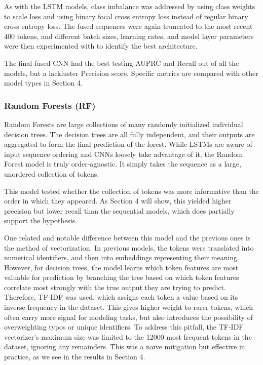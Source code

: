 \documentclass[11pt]{article}
\begin{document}
As with the LSTM models, class imbalance was addressed by using class weights
to scale loss and using binary focal cross entropy loss instead of
regular binary cross entropy loss. The fused sequences were again
truncated to the most recent 400 tokens, and different batch sizes,
learning rates, and model layer parameters were then experimented with to
identify the best architecture.

The final fused CNN had the best testing AUPRC and Recall out of all the
models, but a lackluster Precision score. Specific metrics are compared 
with other model types in Section 4.

\subsubsection{Random Forests (RF)}\label{random-forests-rf}

Random Forests are large collections of many randomly initialized
individual decision trees. The decision trees are all fully independent,
and their outputs are aggregated to form the final prediction of the
forest. While LSTMs are aware of input sequence ordering and CNNs
loosely take advantage of it, the Random Forest model is truly
order-agnostic. It simply takes the sequence as a large, unordered
collection of tokens.

This model tested whether the collection of tokens was
more informative than the order in which they appeared. As Section 4
will show, this yielded higher precision but lower recall than the
sequential models, which does partially support the hypothesis.

One related and notable difference between this model and the previous
ones is the method of vectorization. In previous models, the
tokens were translated into numerical identifiers, and then into embeddings representing
their meaning. However, for decision trees, the model learns which token
features are most valuable for prediction by branching the tree based on
which token features correlate most strongly with the true output they are
trying to predict. Therefore, TF-IDF was used, which
assigns each token a value based on its inverse frequency in the
dataset. This gives higher weight to rarer tokens, which often carry
more signal for modeling tasks, but also introduces the possibility of
overweighting typos or unique identifiers. To address this pitfall, the
TF-IDF vectorizer's maximum size was limited to the 12000 most frequent
tokens in the dataset, ignoring any remainders. This was a na\"{i}ve
mitigation but effective in practice, as we see in the results in
Section 4.
\end{document}
